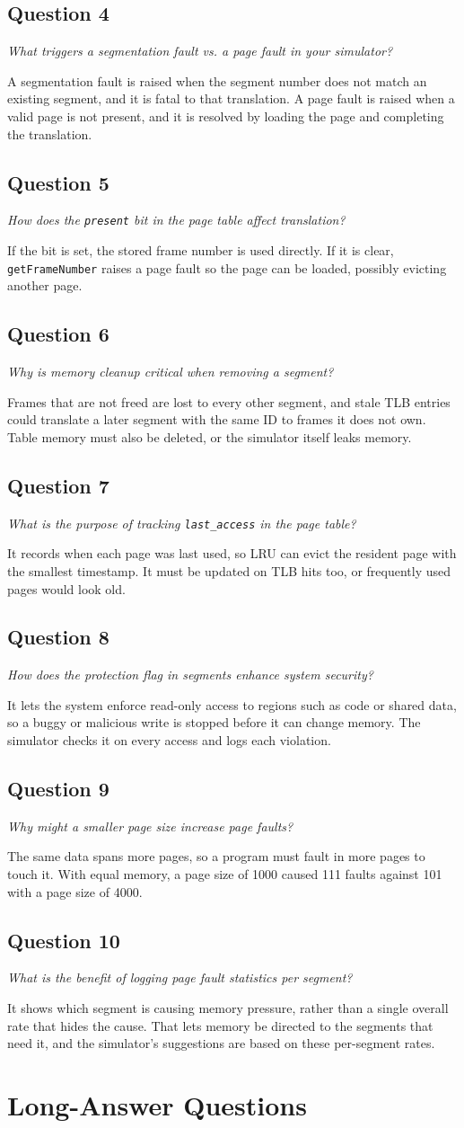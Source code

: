 \documentclass[11pt]{article}
\newcommand{\question}[2]{\subsection*{Question #1}\noindent\textit{#2}\par\medskip}
\newcommand{\code}[1]{\texttt{#1}}
\begin{document}
\question{4}{What triggers a segmentation fault vs. a page fault in your simulator?}
A segmentation fault is raised when the segment number does not match an existing
segment, and it is fatal to that translation. A page fault is raised when a valid
page is not present, and it is resolved by loading the page and completing the
translation.

\question{5}{How does the \code{present} bit in the page table affect translation?}
If the bit is set, the stored frame number is used directly. If it is clear,
\code{getFrameNumber} raises a page fault so the page can be loaded, possibly
evicting another page.

\question{6}{Why is memory cleanup critical when removing a segment?}
Frames that are not freed are lost to every other segment, and stale TLB entries
could translate a later segment with the same ID to frames it does not own.
Table memory must also be deleted, or the simulator itself leaks memory.

\question{7}{What is the purpose of tracking \code{last\_access} in the page table?}
It records when each page was last used, so LRU can evict the resident page with
the smallest timestamp. It must be updated on TLB hits too, or frequently used
pages would look old.

\question{8}{How does the protection flag in segments enhance system security?}
It lets the system enforce read-only access to regions such as code or shared
data, so a buggy or malicious write is stopped before it can change memory. The
simulator checks it on every access and logs each violation.

\question{9}{Why might a smaller page size increase page faults?}
The same data spans more pages, so a program must fault in more pages to touch
it. With equal memory, a page size of 1000 caused 111 faults against 101 with a
page size of 4000.

\question{10}{What is the benefit of logging page fault statistics per segment?}
It shows which segment is causing memory pressure, rather than a single overall
rate that hides the cause. That lets memory be directed to the segments that need
it, and the simulator's suggestions are based on these per-segment rates.

\section{Long-Answer Questions}
\end{document}
